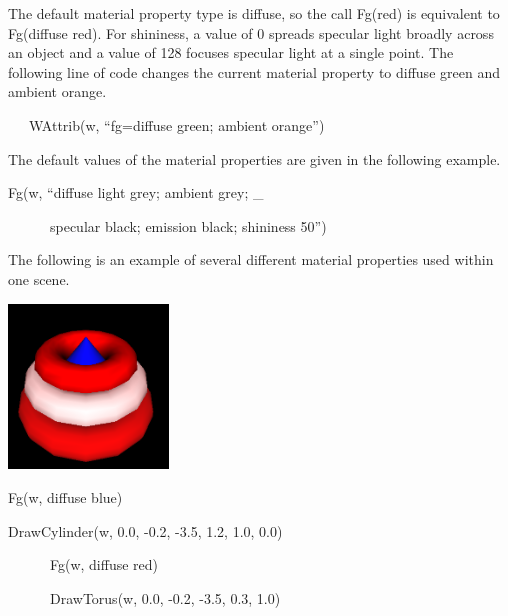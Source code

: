 \documentclass[letterpaper]{article}
\begin{document}
{\bigskip

{
The default material property type is diffuse, so the call \textsf{Fg({\textquotedbl}red{\textquotedbl})} is equivalent
to \textsf{Fg({\textquotedbl}diffuse red{\textquotedbl})}. For shininess, a value of 0 spreads specular light broadly
across an object and a value of 128 focuses specular light at a single point. The following line of code changes the
current material property to diffuse green and ambient orange. }


\bigskip

{\ttfamily
\ \ \ \textsf{WAttrib(w, ``fg=diffuse green; ambient orange'')}}


\bigskip

{
The default values of the material properties are given in the following example. }


\bigskip

{\sffamily
Fg(w, ``diffuse light grey; ambient grey; \_}

{\sffamily
\ \ \ \ \ \ specular black; emission black; shininess 50'')}


\bigskip

{
The following is an example of several different material properties used within one scene. }

{\centering  \includegraphics[width=1.6799in,height=1.7299in]{utr9/utr9-img024.png} \par}

\bigskip


\bigskip

{\sffamily
Fg(w, {\textquotedbl}diffuse blue{\textquotedbl})}

{\sffamily
DrawCylinder(w, 0.0, -0.2, -3.5, 1.2, 1.0, 0.0)}

{\sffamily
\ \ \ \ \ \ Fg(w, {\textquotedbl}diffuse red{\textquotedbl})}

{\sffamily
\ \ \ \ \ \ DrawTorus(w, 0.0, -0.2, -3.5, 0.3, 1.0)}

}
\end{document}
